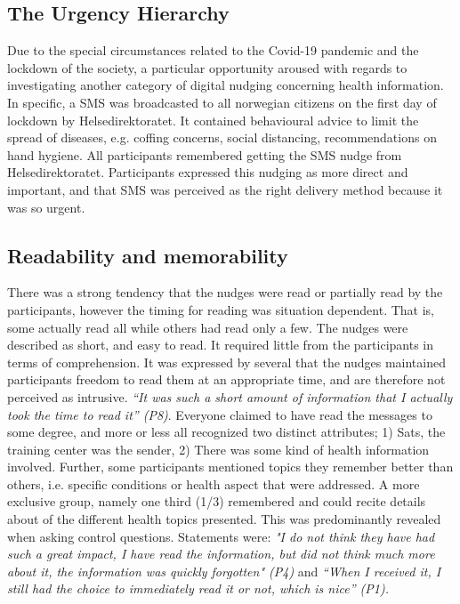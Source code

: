 \subsection{The Urgency Hierarchy}
Due to the special circumstances related to the Covid-19 pandemic and the lockdown of the society, a particular opportunity aroused with regards to investigating another category of digital nudging concerning health information. In specific, a SMS was broadcasted to all norwegian citizens on the first day of lockdown by Helsedirektoratet. It contained behavioural advice to limit the spread of diseases, e.g. coffing concerns, social distancing, recommendations on hand hygiene. All participants remembered getting the SMS nudge from Helsedirektoratet. Participants expressed this nudging as more direct and important, and that SMS was perceived as the right delivery method because it was so urgent. 

\subsection{Readability and memorability}

There was a strong tendency that the nudges were read or partially read by the participants, however the timing for reading was situation dependent. That is, some actually read all while others had read only a few. The nudges were described as short, and easy to read. It required little from the participants in terms of comprehension. It was expressed by several that the nudges maintained participants freedom to read them at an appropriate time, and are therefore not perceived as intrusive. \textit{“It was such a short amount of information that I actually took the time to read it” (P8)}. Everyone claimed to have read the messages to some degree, and more or less all recognized two distinct attributes; 1) Sats, the training center was the sender, 2) There was some kind of health information involved. Further, some participants mentioned topics they remember better than others, i.e. specific conditions or health aspect that were addressed. A more exclusive group, namely one third (1/3) remembered and could recite details about of the different health topics presented. This was predominantly revealed when asking control questions. Statements were:  \textit{"I do not think they have had such a great impact, I have read the information, but did not think much more about it, the information was quickly forgotten" (P4)} and \textit{“When I received it, I still had the choice to immediately read it or not, which is nice” (P1). }

